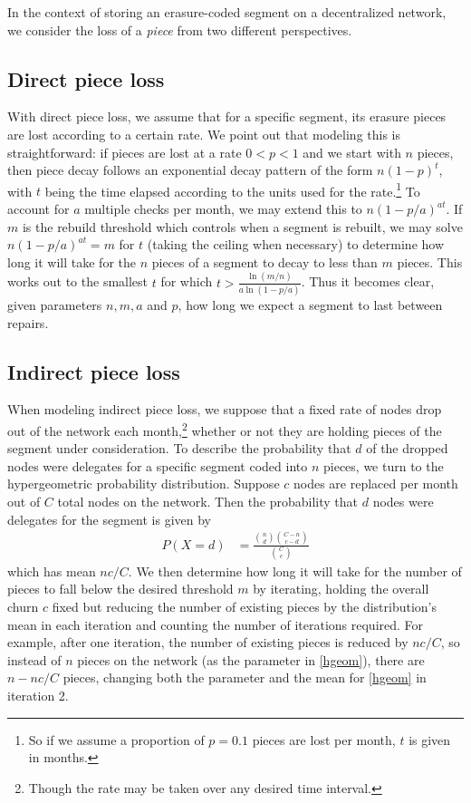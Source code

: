 In the context of storing an erasure-coded segment on a decentralized network, we consider the loss of a {\em piece} from two different perspectives.

\subsection{Direct piece loss}
With direct piece loss, we assume that for a specific segment, its erasure pieces are lost according to a certain rate. We point out that modeling this is straightforward: if pieces are lost at a rate $0<p<1$ and we start with $n$ pieces, then piece decay follows an exponential decay pattern of the form $n(1-p)^t$, with $t$ being the time elapsed according to the units used for the rate.\footnote{So if we assume a proportion of $p=0.1$ pieces are lost per month, $t$ is given in months.}
To account for $a$ multiple checks per month, we may extend this to $n(1-p/a)^{at}$. If $m$ is the rebuild threshold which controls when a segment is rebuilt, we may solve $n(1-p/a)^{at}=m$ for $t$ (taking the ceiling when necessary) to determine how long it will take for the $n$ pieces of a segment to decay to less than $m$ pieces. This works out to the smallest $t$ for which
$t>\frac{\ln(m/n)}{a\ln(1-p/a)}$. Thus it becomes clear, given parameters $n,m,a$ and $p$, how long we expect a segment to last between repairs.

\subsection{Indirect piece loss}

When modeling indirect piece loss, we suppose that a fixed rate of nodes
drop out of the network each month,\footnote{Though the rate may be taken over
any desired time interval.} whether or not they are holding pieces of the segment
under consideration. To describe the probability that $d$ of the dropped nodes
were delegates for a specific segment coded into $n$ pieces, we turn to the
hypergeometric probability distribution. Suppose $c$ nodes are replaced per
month out of $C$ total nodes on the network. Then the probability that $d$
nodes were delegates for the segment is given by
\begin{align}
&&    P(X=d)&=\frac{\binom{n}{d}\binom{C-n}{c-d}}{\binom{C}{c}}\label{hgeom} &&
\end{align}
which has mean $nc/C$. We then determine how long it will take for the number of pieces to fall below the desired threshold $m$ by iterating, holding the overall churn $c$ fixed but reducing the number of existing pieces by the distribution's mean in each iteration and counting the number of iterations required. For example, after one iteration, the number of existing pieces is reduced by $nc/C$, so instead of $n$ pieces on the network (as the parameter in \eqref{hgeom}), there are $n-nc/C$ pieces, changing both the parameter and the mean for \eqref{hgeom} in iteration 2.

